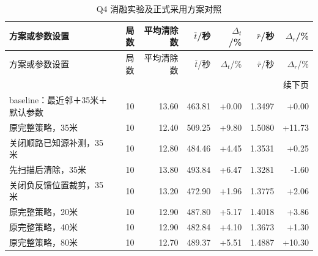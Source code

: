 \begingroup\small\setlength{\tabcolsep}{3pt}
\begin{longtable}{p{}rrrrrr}
\caption{Q4 消融实验及正式采用方案对照}\label{tab:official-q4-2}\\
\toprule
方案或参数设置 & 局数 & 平均清除数 & $\bar t$/秒 & $\Delta_t$/\% & $\bar r$/秒 & $\Delta_r$/\% \\
\midrule\endfirsthead
\toprule
方案或参数设置 & 局数 & 平均清除数 & $\bar t$/秒 & $\Delta_t$/\% & $\bar r$/秒 & $\Delta_r$/\% \\
\midrule\endhead
\midrule\multicolumn{7}{r}{续下页}\\\endfoot
\bottomrule\endlastfoot
baseline：最近邻＋35米＋默认参数 & 10 & 13.60 & 463.81 & +0.00 & 1.3497 & +0.00 \\
原完整策略，35米 & 10 & 12.40 & 509.25 & +9.80 & 1.5080 & +11.73 \\
关闭顺路已知源补测，35米 & 10 & 12.80 & 484.46 & +4.45 & 1.3531 & +0.25 \\
先扫描后清除，35米 & 10 & 13.80 & 493.84 & +6.47 & 1.3281 & -1.60 \\
关闭负反馈位置裁剪，35米 & 10 & 13.20 & 472.90 & +1.96 & 1.3775 & +2.06 \\
原完整策略，20米 & 10 & 12.90 & 487.80 & +5.17 & 1.4018 & +3.86 \\
原完整策略，40米 & 10 & 12.90 & 482.84 & +4.10 & 1.3673 & +1.30 \\
原完整策略，80米 & 10 & 12.70 & 489.37 & +5.51 & 1.4887 & +10.30 \\
\end{longtable}\endgroup

